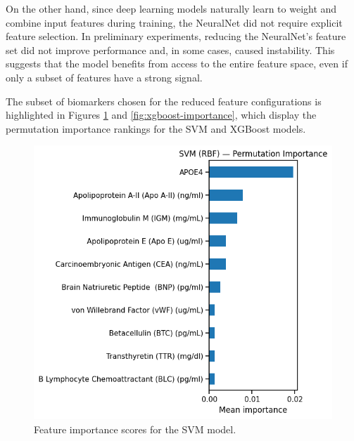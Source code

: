 \documentclass[a4paper,12pt]{article}
\begin{document}
On the other hand, since deep learning models naturally learn to weight and combine input features during training, the NeuralNet did not require explicit feature selection.  In preliminary experiments, reducing the NeuralNet's feature set did not improve performance and, in some cases, caused instability. This suggests that the model benefits from access to the entire feature space, even if only a subset of features have a strong signal.

The subset of biomarkers chosen for the reduced feature configurations is highlighted in Figures \ref{fig:svm-importance} and \ref{fig:xgboost-importance}, which display the permutation importance rankings for the SVM and XGBoost models.

\begin{figure}[H]
\centering
\begin{minipage}{0.48\textwidth}
    \centering
    \includegraphics[width=\textwidth]{Pics/svm_importance.png}
    \caption{Feature importance scores for the SVM model.}
    \label{fig:svm-importance}
\end{minipage}
\hfill
\begin{minipage}{0.48\textwidth}
    \centering

\end{minipage}
\end{figure}
\end{document}
